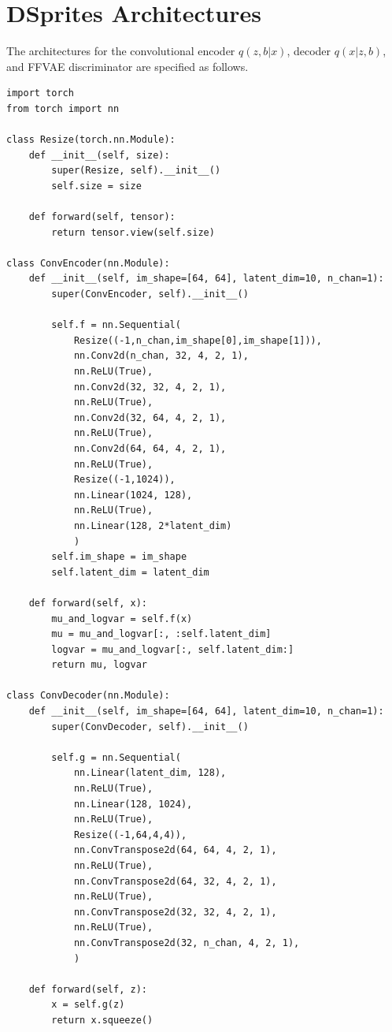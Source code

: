 \section{DSprites Architectures}\label{sec:archs}
The architectures for the convolutional encoder $q(z,b|x)$, decoder $q(x|z,b)$, and FFVAE discriminator are specified as follows.
{\tiny

\begin{verbatim}
import torch
from torch import nn

class Resize(torch.nn.Module):
    def __init__(self, size):
        super(Resize, self).__init__()
        self.size = size

    def forward(self, tensor):
        return tensor.view(self.size)

class ConvEncoder(nn.Module):
    def __init__(self, im_shape=[64, 64], latent_dim=10, n_chan=1):
        super(ConvEncoder, self).__init__()

        self.f = nn.Sequential(
            Resize((-1,n_chan,im_shape[0],im_shape[1])),
            nn.Conv2d(n_chan, 32, 4, 2, 1),
            nn.ReLU(True),
            nn.Conv2d(32, 32, 4, 2, 1),
            nn.ReLU(True),
            nn.Conv2d(32, 64, 4, 2, 1),
            nn.ReLU(True),
            nn.Conv2d(64, 64, 4, 2, 1),
            nn.ReLU(True),
            Resize((-1,1024)),
            nn.Linear(1024, 128),
            nn.ReLU(True),
            nn.Linear(128, 2*latent_dim)
            )
        self.im_shape = im_shape
        self.latent_dim = latent_dim

    def forward(self, x):
        mu_and_logvar = self.f(x)
        mu = mu_and_logvar[:, :self.latent_dim]
        logvar = mu_and_logvar[:, self.latent_dim:]
        return mu, logvar

class ConvDecoder(nn.Module):
    def __init__(self, im_shape=[64, 64], latent_dim=10, n_chan=1):
        super(ConvDecoder, self).__init__()

        self.g = nn.Sequential(
            nn.Linear(latent_dim, 128),
            nn.ReLU(True),
            nn.Linear(128, 1024),
            nn.ReLU(True),
            Resize((-1,64,4,4)),
            nn.ConvTranspose2d(64, 64, 4, 2, 1),
            nn.ReLU(True),
            nn.ConvTranspose2d(64, 32, 4, 2, 1),
            nn.ReLU(True),
            nn.ConvTranspose2d(32, 32, 4, 2, 1),
            nn.ReLU(True),
            nn.ConvTranspose2d(32, n_chan, 4, 2, 1),
            )

    def forward(self, z):
        x = self.g(z)
        return x.squeeze()


\end{verbatim}}
